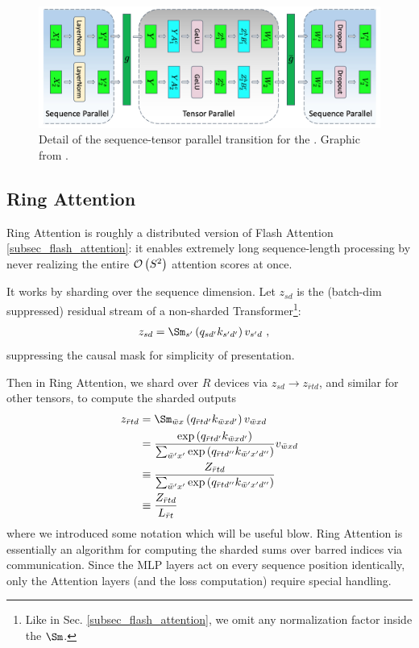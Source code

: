 \documentclass[11pt]{article}
\begin{document}
\begin{figure}[ht]
	\centering
	\includegraphics[scale=.25]{figures/mlp-tensor-sequence-parallel.jpg}
	\caption{Detail of the sequence-tensor parallel transition for the  . Graphic from
		\cite{shoeybi2020megatronlm}. }
	\label{fig_tensor_seq_parallel_detail}
\end{figure}


\subsection{Ring Attention \label{subsec_ring_attention}}

Ring Attention \cite{liu2023ringattentionblockwisetransformers} is roughly a distributed version of
Flash Attention \ref{subsec_flash_attention}: it enables extremely long sequence-length processing
by never realizing the entire $ \mathcal{O} \left( S ^{ 2 } \right)  $ attention scores at once.

It works by sharding over the sequence dimension. Let $ z _{ sd } $ is the (batch-dim suppressed)
residual stream of a non-sharded Transformer\footnote{Like in Sec. \ref{subsec_flash_attention}, we
omit any normalization factor inside the $ \Sm $.}:
\begin{align}
    z _{  sd } &= \Sm _{ s' } \left ( q _{ sd' } k _{ s'd' } \right ) v _{ s'd } \ ,
\end{align}
suppressing the causal mask for simplicity of presentation.

Then in Ring Attention, we shard over $ R $ devices via $ z _{ sd } \longrightarrow z _{ \bar{r}td }
$, and similar for other tensors, to compute the sharded outputs
\begin{align}
    z _{  \bar{r}td } &= \Sm _{ \bar{w} x  } \left ( q _{ \bar{r}t d' } k _{ \bar{w}x d' } \right ) v _{ \bar{w}x d }\nn
     &= \frac{ \exp \left ( q _{ \bar{r}t d' } k _{ \bar{w}x d' } \right ) }{ \sum _{ \bar{w}'x' } \exp \left (q _{ \bar{r}t d'' } k _{ \bar{w}'x' d'' }\right )  } v _{ \bar{w}xd }\nn
     &\equiv \frac{ Z _{\bar{r}td } }{   \sum _{ \bar{w}'x' } \exp  \left (q _{ \bar{r}t d'' } k _{ \bar{w}'x' d'' } \right ) }\nn
     &\equiv \frac{ Z _{\bar{r}td } }{L _{ \bar{r}t }}
\end{align}
where we introduced some notation which will be useful blow. Ring Attention is essentially an
algorithm for computing the sharded sums over barred indices via communication. Since the MLP layers
act on every sequence position identically, only the Attention layers (and the loss computation)
require special handling.
\end{document}
